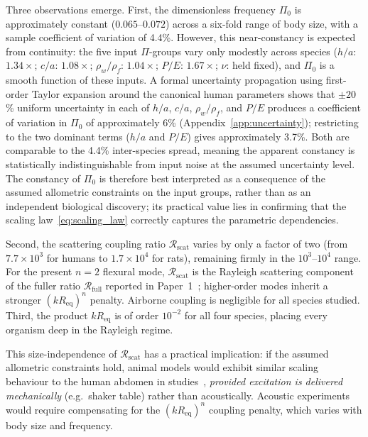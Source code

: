 \documentclass[review]{elsarticle}
\begin{document}
Three observations emerge.  First, the dimensionless frequency $\Pi_0$
is approximately constant ($0.065$--$0.072$) across a six-fold range of
body size, with a sample coefficient of variation of 4.4\%.  However, this
near-constancy is expected from continuity: the five input $\Pi$-groups
vary only modestly across species ($h/a$: $1.34\times$; $c/a$:
$1.08\times$; $\rho_w/\rho_f$: $1.04\times$; $P/E$: $1.67\times$;
$\nu$: held fixed), and $\Pi_0$ is a smooth function of these inputs.
A formal uncertainty propagation using first-order Taylor expansion
around the canonical human parameters shows that $\pm 20$\% uniform
uncertainty in each of $h/a$, $c/a$, $\rho_w/\rho_f$, and $P/E$
produces a coefficient of variation in $\Pi_0$ of approximately 6\%
(Appendix~\ref{app:uncertainty}); restricting to the two dominant terms
($h/a$ and $P/E$) gives approximately 3.7\%.  Both are comparable to the 4.4\%
inter-species spread, meaning the apparent constancy is statistically
indistinguishable from input noise at the assumed uncertainty level.
The constancy of $\Pi_0$ is therefore best interpreted as a consequence
of the assumed allometric constraints on the input groups, rather than
as an independent biological discovery; its practical value lies in
confirming that the scaling law~\eqref{eq:scaling_law} correctly
captures the parametric dependencies.

Second, the scattering coupling ratio
$\mathcal{R}_\mathrm{scat}$ varies
by only a factor of two (from $7.7 \times 10^3$ for humans to
$1.7 \times 10^4$ for rats), remaining firmly in the $10^3$--$10^4$ range.
For the present $n=2$ flexural mode, $\mathcal{R}_\mathrm{scat}$ is the
Rayleigh scattering component of the fuller ratio $\mathcal{R}_\mathrm{full}$
reported in Paper~1~\cite{Mace2026browntone}; higher-order modes inherit a
stronger $(kR_\mathrm{eq})^n$ penalty.  Airborne coupling is negligible for
all species studied.  Third, the
product $kR_\mathrm{eq}$ is of order $10^{-2}$ for all four species, placing every
organism deep in the Rayleigh regime.

This size-independence of $\mathcal{R}_\mathrm{scat}$ has a practical
implication:
if the assumed allometric constraints hold, animal models would exhibit
similar scaling behaviour to the human abdomen in
studies~\cite{vonGierke1971,ISO2631}, \emph{provided excitation is
delivered mechanically} (e.g.\ shaker table) rather than acoustically.  Acoustic experiments would require
compensating for the $(kR_\mathrm{eq})^n$ coupling penalty, which varies with body
size and frequency.
\end{document}
